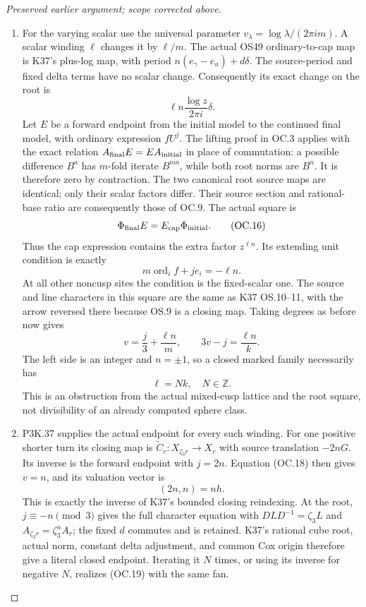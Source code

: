 \begin{proof}[Preserved earlier argument; scope corrected above]
\begin{enumerate}[label=\arabic*.]
\item For the varying scalar use the universal parameter
\(v_\lambda=\log\lambda/(2\pi i m)\). A scalar winding
\(\ell\) changes it by \(\ell/m\). The actual OS49
ordinary-to-cap map is K37's plus-log map, with period
\(n(e_\gamma-e_u)+d\delta\). The source-period and fixed
delta terms have no scalar change. Consequently its exact change
on the root is
\[
                  \ell n\frac{\log z}{2\pi i}\delta.    \tag{OC.15}
\]
Let \(E\) be a forward endpoint from the initial model to the
continued final model, with ordinary expression \(fU^j\).
The lifting proof in OC.3 applies with the exact relation
\(A_{\rm final}E=EA_{\rm initial}\) in place of commutation:
a possible difference \(B^a\) has \(m\)-fold iterate
\(B^{ma}\), while both root norms are \(B^n\). It is
therefore zero by contraction. The two canonical root source maps
are identical; only their scalar factors differ. Their source
section and rational-base ratio are consequently those of OC.9.
The actual square is
\[
          \Phi_{\rm final}E=E_{\rm cap}\Phi_{\rm initial}.
                                                               \tag{OC.16}
\]
Thus the cap expression contains the extra factor \(z^{\ell n}\).
Its extending unit condition is exactly
\[
        m\operatorname{ord}_{i}f+je_i=-\ell n.            \tag{OC.17}
\]
At all other noncusp sites the condition is the fixed-scalar one.
The source and line characters in this square are the same as K37
OS.10--11, with the arrow reversed there because OS.9 is a closing
map. Taking degrees as before now gives
\[
             v=\frac j3+\frac{\ell n}{m},\qquad
                      3v-j=\frac{\ell n}{k}.             \tag{OC.18}
\]
The left side is an integer and \(n=\pm1\), so a closed
marked family necessarily has
\[
                              \ell=Nk,\quad N\in\mathbb Z.
                                                               \tag{OC.19}
\]
This is an obstruction from the actual mixed-cusp lattice and the
root square, not divisibility of an already computed sphere class.

\item P3K.37 supplies the actual endpoint for every such winding. For one
positive shorter turn its closing map is
\(\widetilde C_r:X_{\zeta_3r}\to X_r\) with source
translation \(-2nG\). Its inverse is the forward endpoint with
\(j=2n\). Equation (OC.18) then gives \(v=n\), and its
valuation vector is
\[
                           (2n,n)=n h.                  \tag{OC.20}
\]
This is exactly the inverse of K37's bounded closing reindexing.
At the root, \(j\equiv-n\pmod3\) gives the full character
equation with \(DLD^{-1}=\zeta_3L\) and
\(A_{\zeta_3r}=\zeta_3^n A_r\); the fixed \(d\)
commutes and is retained. K37's rational cube root, actual norm,
constant delta adjustment, and common Cox origin therefore give a
literal closed endpoint. Iterating it \(N\) times, or using its
inverse for negative \(N\), realizes (OC.19) with the same fan.


\end{enumerate}
\end{proof}
